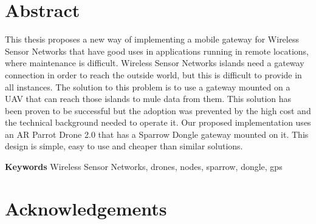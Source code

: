 \chapter*{Abstract}

This thesis proposes a new way of implementing a mobile gateway for Wireless Sensor Networks that have good uses in applications running in remote locations, where maintenance is difficult. Wireless Sensor Networks islands need a gateway connection in order to reach the outside world, but this is difficult to provide in all instances. The solution to this problem is to use a gateway mounted on a UAV that can reach those islands to mule data from them. This solution has been proven to be successful but the adoption was prevented by the high cost and the technical background needed to operate it. Our proposed implementation uses an AR Parrot Drone 2.0 that has a Sparrow Dongle gateway mounted on it. This design is simple, easy to use and cheaper than similar solutions.


\textbf{Keywords} Wireless Sensor Networks, drones, nodes, sparrow, dongle, gps

\chapter*{Acknowledgements}

 



